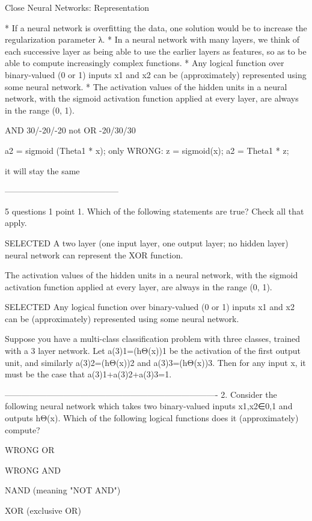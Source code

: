 Close
Neural Networks: Representation


* If a neural network is overfitting the data, one solution would be to increase the regularization parameter λ.
* In a neural network with many layers, we think of each successive layer as being able to use the earlier layers as features, so as to be able to compute increasingly complex functions.
* Any logical function over binary-valued (0 or 1) inputs x1 and x2 can be (approximately) represented using some neural network.
* The activation values of the hidden units in a neural network, with the sigmoid activation function applied at every layer, are always in the range (0, 1).


AND
30/-20/-20  not OR
-20/30/30    


a2 = sigmoid (Theta1 * x); only
	WRONG: z = sigmoid(x); a2 = Theta1 * z;

it will stay the same

-----------------------------------------

5 questions
1
point
1. 
Which of the following statements are true? Check all that apply.

SELECTED A two layer (one input layer, one output layer; no hidden layer) neural network can represent the XOR function.

The activation values of the hidden units in a neural network, with the sigmoid activation function applied at every layer, are always in the range (0, 1).

SELECTED Any logical function over binary-valued (0 or 1) inputs x1 and x2 can be (approximately) represented using some neural network.

Suppose you have a multi-class classification problem with three classes, trained with a 3 layer network. Let a(3)1=(hΘ(x))1 be the activation of the first output unit, and similarly a(3)2=(hΘ(x))2 and a(3)3=(hΘ(x))3. Then for any input x, it must be the case that a(3)1+a(3)2+a(3)3=1.

----------------------------------------------------------------------------
2. 
Consider the following neural network which takes two binary-valued inputs x1,x2∈{0,1} and outputs hΘ(x). Which of the following logical functions does it (approximately) compute?



WRONG OR

WRONG AND

NAND (meaning "NOT AND")

XOR (exclusive OR)

